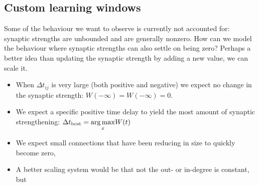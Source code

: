 \subsection{Custom learning windows}
Some of the behaviour we want to observe is currently not accounted for: synaptic strengths are unbounded and are generally nonzero. How can we model the behaviour where synaptic strengths can also settle on being zero? Perhaps a better idea than updating the synaptic strength by adding a new value, we can scale it.
\begin{itemize}
\item When $\Delta t_{ij}$ is very large (both positive and negative) we expect no change in the synaptic strength: $W(-\infty) = W(-\infty) = 0$. 
\item We expect a specific positive time delay to yield the most amount of synaptic strengthening: $\Delta t_{\rm best} = \underset{x}{\arg \max}  W(t)$
\item We expect small connections that have been reducing in size to quickly become zero, 
\item A better scaling system would be that not the out- or in-degree is constant, but 
\end{itemize}




\small{}

\label{LastPage}~


